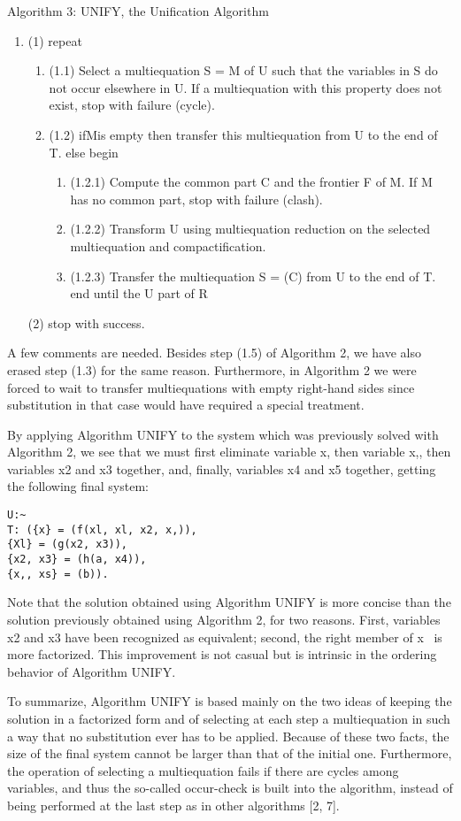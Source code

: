 Algorithm 3: UNIFY, the Unification Algorithm
\begin{enumerate}
  \item 
(1) repeat
\begin{enumerate}
  \item 
(1.1) Select a multiequation S = M of U such that the variables in S do not occur
elsewhere in U. If a multiequation with this property does not exist, stop with
failure (cycle).
  \item 
(1.2) ifMis empty
then transfer this multiequation from U to the end of T.
else begin
\begin{enumerate}
  \item 
(1.2.1) Compute the common part C and the frontier F of M. If M has
no common part, stop with failure (clash).
  \item 
(1.2.2) Transform U using multiequation reduction on the selected
multiequation and compactification.
  \item 
(1.2.3) Transfer the multiequation S = (C) from U to the end of T.
end
until the U part of R
\end{enumerate}
\end{enumerate}
(2) stop with success.  
\end{enumerate}
 
A few comments are needed. Besides step (1.5) of Algorithm 2, we have also
erased step (1.3) for the same reason. Furthermore, in Algorithm 2 we were forced
to wait to transfer multiequations with empty right-hand sides since substitution
in that case would have required a special treatment. 

By applying Algorithm UNIFY to the system which was previously solved with
Algorithm 2, we see that we must first eliminate variable x, then variable x,, then
variables x2 and x3 together, and, finally, variables x4 and x5 together, getting the
following final system:
\begin{verbatim}
U:~
T: ({x} = (f(xl, xl, x2, x,)),
{Xl} = (g(x2, x3)),
{x2, x3} = (h(a, x4)),
{x,, xs} = (b)).  
\end{verbatim}

Note that the solution obtained using Algorithm UNIFY is more concise than
the solution previously obtained using Algorithm 2, for two reasons. First,
variables x2 and x3 have been recognized as equivalent; second, the right member
of x~ is more factorized. This improvement is not casual but is intrinsic in the
ordering behavior of Algorithm UNIFY.

To summarize, Algorithm UNIFY is based mainly on the two ideas of keeping
the solution in a factorized form and of selecting at each step a multiequation in
such a way that no substitution ever has to be applied. Because of these two
facts, the size of the final system cannot be larger than that of the initial one.
Furthermore, the operation of selecting a multiequation fails if there are cycles
among variables, and thus the so-called occur-check is built into the algorithm,
instead of being performed at the last step as in other algorithms [2, 7]. 